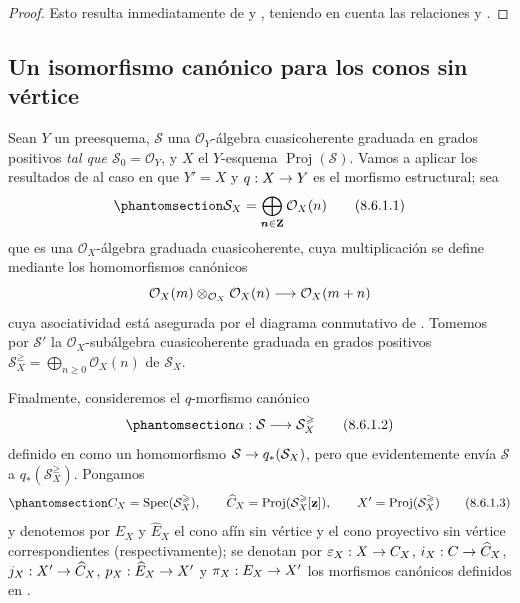 \documentclass[oneside,10pt]{amsart}
\makeatletter
\renewcommand{\geq}{\geqslant}
\newcommand{\ega@arrow}[2]{\mathchoice{#1}{#2}{#2}{#2}}
\renewcommand{\to}{\ega@arrow{\longrightarrow}{\rightarrow}}
\newcommand{\oldpage}[2][]{\marginnote{\normalfont\footnotesize\textbf{#1}~|~#2}\ignorespaces}
\let\EGAOriginalLabel\label
\renewcommand{\label}[1]{\phantomsection\EGAOriginalLabel{#1}}
\makeatother
\begin{document}
\begin{proof}
Esto resulta inmediatamente de  y , teniendo en cuenta las relaciones  y .
\end{proof}
\subsection{Un isomorfismo canónico para los conos sin vértice}
\label{subsection:II.8.6-fr}

\begin{env}[8.6.1]
\label{II.8.6.1-fr}
Sean $Y$ un preesquema, $\mathcal{S}$ una $\mathcal{O}_Y$-álgebra cuasicoherente graduada en grados positivos \emph{tal que $\mathcal{S}_0=\mathcal{O}_Y$}, y $X$ el $Y$-esquema $\operatorname{Proj}(\mathcal{S})$.
Vamos a aplicar los resultados de  al caso en que $Y'=X$ y $q:X\to Y$ es el morfismo estructural;
sea
\begin{equation}
\label{II.8.6.1.1-fr}
  \mathcal{S}_X=\bigoplus_{\boldsymbol{n}\in\mathbf{Z}}\mathcal{O}_X(n)
\tag{8.6.1.1}
\end{equation}
\oldpage[II]{172}
que es una $\mathcal{O}_X$-álgebra graduada cuasicoherente, cuya multiplicación se define mediante los homomorfismos canónicos 
\[
  \mathcal{O}_X(m)\otimes_{\mathcal{O}_X}\mathcal{O}_X(n)
  \to\mathcal{O}_X(m+n)
\]
cuya asociatividad está asegurada por el diagrama conmutativo de .
Tomemos por $\mathcal{S}'$ la $\mathcal{O}_X$-subálgebra cuasicoherente graduada en grados positivos $\mathcal{S}_X^{\geq}=\bigoplus_{n\geq0}\mathcal{O}_X(n)$ de $\mathcal{S}_X$.

Finalmente, consideremos el $q$-morfismo canónico
\begin{equation}
\label{II.8.6.1.2-fr}
  \alpha:\mathcal{S}\to\mathcal{S}_X^{\geq}
\tag{8.6.1.2}
\end{equation}
definido en  como un homomorfismo $\mathcal{S}\to q_*(\mathcal{S}_X)$, pero que evidentemente envía $\mathcal{S}$ a $q_*(\mathcal{S}_X^{\geq})$.
Pongamos
\begin{equation}
\label{II.8.6.1.3-fr}
  C_X=\operatorname{Spec}(\mathcal{S}_X^{\geq}),\qquad
  \widehat{C}_X=\operatorname{Proj}(\mathcal{S}_X^{\geq}[\mathbf{z}]),\qquad
  X'=\operatorname{Proj}(\mathcal{S}_X^{\geq})
\tag{8.6.1.3}
\end{equation}
y denotemos por $E_X$ y $\widehat{E}_X$ el cono afín sin vértice y el cono proyectivo sin vértice correspondientes (respectivamente);
se denotan por $\varepsilon_X:X\to C_X$, $i_X:C\to\widehat{C}_X$, $j_X:X'\to\widehat{C}_X$, $p_X:\widehat{E}_X\to X'$ y $\pi_X:E_X\to X'$ los morfismos canónicos definidos en .
\end{env}
\end{document}
